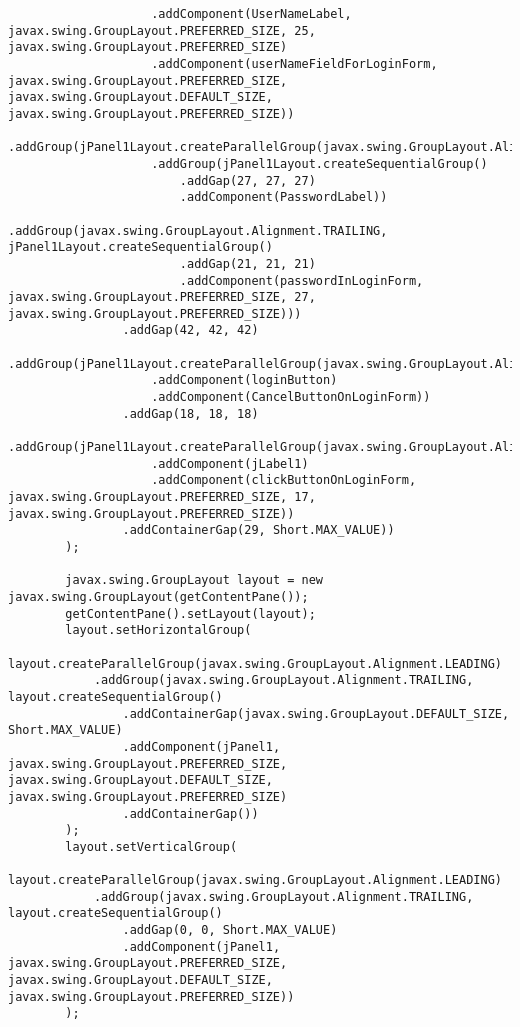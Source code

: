 \documentclass[12pt,a4paper]{article}
\begin{document}
\begin{lstlisting}
                    .addComponent(UserNameLabel, javax.swing.GroupLayout.PREFERRED_SIZE, 25, javax.swing.GroupLayout.PREFERRED_SIZE)
                    .addComponent(userNameFieldForLoginForm, javax.swing.GroupLayout.PREFERRED_SIZE, javax.swing.GroupLayout.DEFAULT_SIZE, javax.swing.GroupLayout.PREFERRED_SIZE))
                .addGroup(jPanel1Layout.createParallelGroup(javax.swing.GroupLayout.Alignment.LEADING)
                    .addGroup(jPanel1Layout.createSequentialGroup()
                        .addGap(27, 27, 27)
                        .addComponent(PasswordLabel))
                    .addGroup(javax.swing.GroupLayout.Alignment.TRAILING, jPanel1Layout.createSequentialGroup()
                        .addGap(21, 21, 21)
                        .addComponent(passwordInLoginForm, javax.swing.GroupLayout.PREFERRED_SIZE, 27, javax.swing.GroupLayout.PREFERRED_SIZE)))
                .addGap(42, 42, 42)
                .addGroup(jPanel1Layout.createParallelGroup(javax.swing.GroupLayout.Alignment.BASELINE)
                    .addComponent(loginButton)
                    .addComponent(CancelButtonOnLoginForm))
                .addGap(18, 18, 18)
                .addGroup(jPanel1Layout.createParallelGroup(javax.swing.GroupLayout.Alignment.BASELINE)
                    .addComponent(jLabel1)
                    .addComponent(clickButtonOnLoginForm, javax.swing.GroupLayout.PREFERRED_SIZE, 17, javax.swing.GroupLayout.PREFERRED_SIZE))
                .addContainerGap(29, Short.MAX_VALUE))
        );

        javax.swing.GroupLayout layout = new javax.swing.GroupLayout(getContentPane());
        getContentPane().setLayout(layout);
        layout.setHorizontalGroup(
            layout.createParallelGroup(javax.swing.GroupLayout.Alignment.LEADING)
            .addGroup(javax.swing.GroupLayout.Alignment.TRAILING, layout.createSequentialGroup()
                .addContainerGap(javax.swing.GroupLayout.DEFAULT_SIZE, Short.MAX_VALUE)
                .addComponent(jPanel1, javax.swing.GroupLayout.PREFERRED_SIZE, javax.swing.GroupLayout.DEFAULT_SIZE, javax.swing.GroupLayout.PREFERRED_SIZE)
                .addContainerGap())
        );
        layout.setVerticalGroup(
            layout.createParallelGroup(javax.swing.GroupLayout.Alignment.LEADING)
            .addGroup(javax.swing.GroupLayout.Alignment.TRAILING, layout.createSequentialGroup()
                .addGap(0, 0, Short.MAX_VALUE)
                .addComponent(jPanel1, javax.swing.GroupLayout.PREFERRED_SIZE, javax.swing.GroupLayout.DEFAULT_SIZE, javax.swing.GroupLayout.PREFERRED_SIZE))
        );


\end{lstlisting}
\end{document}
